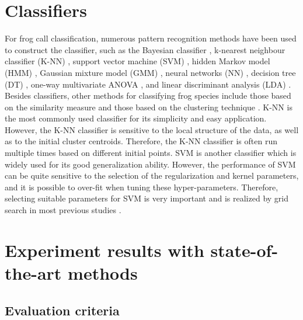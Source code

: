 \section{Classifiers}
\label{classifiers}
For frog call classification, numerous pattern recognition methods have been used to construct the classifier, such as the Bayesian classifier \citep{Brandes2006}, k-nearest neighbour classifier (K-NN) \citep{ huang2008realization,huang2009frog, han2011acoustic, dayou2011classification, jaafar2013, Gingras2013, jaafar2013mfcc,jaafarcomparative, yuan2012frog, vaca2010using, Xie1504:Acoustic, emr2015Xie, jie2015escience, feature2012Colona}, support vector machine (SVM) \citep{huang2008realization,acevedo2009automated, huang2009frog, tanintelligent2014, Gingras2013,jaafarcomparative,jie2015ICIP}, hidden Markov model (HMM) \citep{brandes2008feature}, Gaussian mixture model (GMM) \citep{huang2008realization, Gingras2013}, neural networks (NN) \citep{Huang20141, yen2002automatic}, decision tree (DT) \citep{grigg1996monitoring, acevedo2009automated}, one-way multivariate ANOVA \citep{camacho2013automatic}, and linear discriminant analysis (LDA) \citep{acevedo2009automated,lee2006automatic}.  Besides classifiers, other methods for classifying frog species include those based on the similarity measure \citep{croker2012using, dang2008lightweight, chen2012automatic} and those based on the clustering technique \citep{colombia2009frogs, wei2012distributed, bedoya2014automatic}. K-NN is the most commonly used classifier for its simplicity and easy application. However, the K-NN classifier is sensitive to the local structure of the data, as well as to the initial cluster centroids. Therefore, the K-NN classifier is often run multiple times based on different initial points. 
SVM is another classifier which is widely used for its good generalization ability. However, the performance of SVM can be quite sensitive to the selection of the regularization and kernel parameters, and it is possible to over-fit when tuning these hyper-parameters. Therefore, selecting suitable parameters for SVM is very important and is realized by grid search in most previous studies  \citep{hsu2003practical}.



\section{Experiment results with state-of-the-art methods}
\label{experiment}


\subsection{Evaluation criteria}

